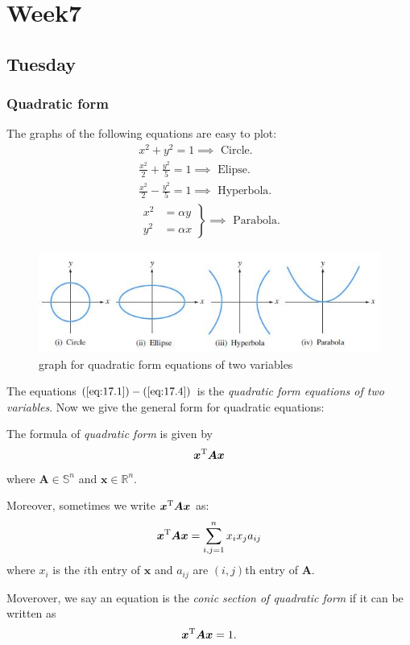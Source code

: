 
\chapter{Week7}

\section{Tuesday}\subsection{Quadratic form}
The graphs of the following equations are easy to plot:
\begin{gather}
x^2+y^2=1\label{eq:17.1}\implies\text{ Circle}.\\
\frac{x^2}{2}+\frac{y^2}{5}=1\label{eq:17.2}\implies\text{ Elipse}.\\
\frac{x^2}{2}-\frac{y^2}{5}=1\label{eq:17.3}\implies\text{ Hyperbola}.\\
\left.\begin{aligned}
x^2&=\alpha y\\
y^2&=\alpha x
\end{aligned}\right\}\implies\text{ Parabola}.\label{eq:17.4}
\end{gather}
\begin{figure}[H]
\centering\includegraphics{week7/shape}
\caption{graph for quadratic form equations of two variables}
\end{figure}
The equations $(\ref{eq:17.1})-(\ref{eq:17.4})$ is the \textit{quadratic form equations of two variables}. Now we give the general form for quadratic equations:
\begin{definition}
The formula of \emph{quadratic form} is given by
\[
\bm x^{\mathrm T}\bm A\bm x
\]
where $\bm A\in\mathbb{S}^n$ and $\bm x\in\mathbb{R}^{n}$.

Moreover, sometimes we write $\bm x^{\mathrm T}\bm A\bm x$ as:
\[
\bm x^{\mathrm T}\bm A\bm x=\sum_{i,j=1}^{n}x_ix_ja_{ij}
\]
where $x_i$ is the $i$th entry of $\bm x$ and $a_{ij}$ are $(i,j)$th entry of $\bm A$.
\end{definition}
Moverover, we say an equation is the \emph{conic section of quadratic form} if it can be written as
\[
\bm x^{\mathrm T}\bm A\bm x=1.
\]

